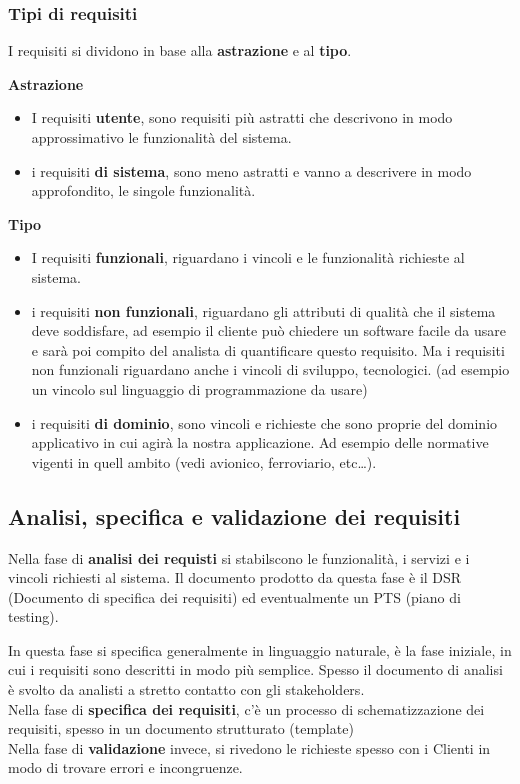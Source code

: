 \subsubsection{Tipi di requisiti}
I requisiti si dividono in base alla \textbf{astrazione} e al \textbf{tipo}.
\begin{center}
    \textbf{Astrazione}
    \begin{itemize}
        \item I requisiti \textbf{utente}, sono requisiti pi\`u astratti che descrivono in modo approssimativo
                le funzionalit\`a del sistema.
        \item i requisiti \textbf{di sistema}, sono meno astratti e vanno a descrivere in modo 
                approfondito, le singole funzionalit\`a.
    \end{itemize}    
    \textbf{Tipo}
    \begin{itemize}
        \item I requisiti \textbf{funzionali}, riguardano i vincoli e le funzionalit\`a richieste
                al sistema.
        \item i requisiti \textbf{non funzionali}, riguardano gli attributi di qualit\`a che
                il sistema deve soddisfare, ad esempio il cliente pu\`o chiedere un software facile da usare
                e sar\`a poi compito del analista di quantificare questo requisito.
                Ma i requisiti non funzionali riguardano anche i vincoli di sviluppo, tecnologici.
                (ad esempio un vincolo sul linguaggio di programmazione da usare)
        \item i requisiti \textbf{di dominio}, sono vincoli e richieste che sono proprie del dominio
                applicativo in cui agir\`a la nostra applicazione.
                Ad esempio delle normative vigenti in quell ambito (vedi avionico, ferroviario, etc\dots).
    \end{itemize}    
\end{center}
\subsection{Analisi, specifica e validazione dei requisiti}
Nella fase di \textbf{analisi dei requisti }
si stabilscono le funzionalit\`a, i servizi e i vincoli richiesti al sistema.
Il documento prodotto da questa fase \`e il DSR (Documento di specifica dei requisiti) ed 
eventualmente un PTS (piano di testing).

In questa fase si specifica generalmente in linguaggio naturale,
 \`e la fase iniziale, in cui i requisiti sono descritti in modo pi\`u semplice.
 Spesso il documento di analisi \`e svolto da analisti a stretto contatto con gli stakeholders.
\\
Nella fase di \textbf{specifica dei requisiti}, c'\`e un processo di schematizzazione
dei requisiti, spesso in un documento strutturato (template)
\\
Nella fase di \textbf{validazione} invece, si rivedono le richieste spesso con i Clienti
in modo di trovare errori e incongruenze.


